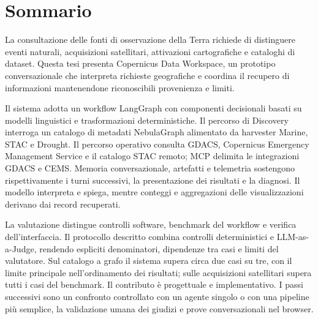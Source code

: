 \chapter*{Sommario}

La consultazione delle fonti di osservazione della Terra richiede di distinguere
eventi naturali, acquisizioni satellitari, attivazioni cartografiche e cataloghi
di dataset. Questa tesi presenta Copernicus Data Workspace, un prototipo
conversazionale che interpreta richieste geografiche e coordina il recupero
di informazioni mantenendone riconoscibili provenienza e limiti.

Il sistema adotta un workflow LangGraph con componenti decisionali basati su
modelli linguistici e trasformazioni deterministiche. Il percorso di Discovery
interroga un catalogo di metadati NebulaGraph alimentato da harvester Marine,
STAC e Drought. Il percorso operativo consulta GDACS, Copernicus Emergency
Management Service e il catalogo STAC remoto; MCP delimita le integrazioni
GDACS e CEMS. Memoria conversazionale, artefatti e telemetria sostengono
rispettivamente i turni successivi, la presentazione dei risultati e la diagnosi.
Il modello interpreta e spiega, mentre conteggi e aggregazioni delle
visualizzazioni derivano dai record recuperati.

La valutazione distingue controlli software, benchmark del workflow e verifica
dell'interfaccia. Il protocollo descritto combina controlli deterministici e
LLM-as-a-Judge, rendendo espliciti denominatori, dipendenze tra casi e limiti
del valutatore. Sul catalogo a grafo il sistema supera circa due casi su tre,
con il limite principale nell'ordinamento dei risultati; sulle acquisizioni
satellitari supera tutti i casi del benchmark. Il contributo è progettuale e
implementativo. I passi successivi sono un confronto controllato con un agente
singolo o con una pipeline più semplice, la validazione umana dei giudizi e
prove conversazionali nel browser.

\clearpage
